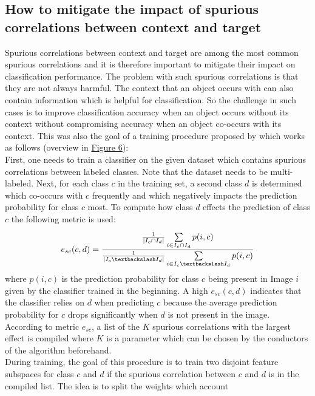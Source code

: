 \documentclass{article}
\begin{document}
\subsection{How to mitigate the impact of spurious correlations between context and target}
\label{sec:contextSuppr}
Spurious correlations between context and target are among the most common spurious correlations and it is
therefore important to mitigate their impact on classification performance. The problem with such spurious correlations
is that they are not always harmful. The context that an object occurs with can also contain information which is helpful
for classification. So the challenge in such cases is to improve classification accuracy when an object occurs without
its context without compromising accuracy when an object co-occurs with its context. This was also the goal of a 
training procedure proposed by \cite{Singh_2020_CVPR} which works as follows
(overview in \hyperref[fig:contextSupprImg]{Figure 6}): \\
First, one needs to train a classifier on the given dataset which contains spurious correlations between labeled classes.
Note that the dataset needs to be multi-labeled. Next, for each class $c$ in the training set, a second class $d$ is
determined which co-occurs with $c$ frequently and which negatively impacts the prediction probability for class $c$ most.
To compute how class $d$ effects the prediction of class $c$ the following metric is used:  
\begin{align*}
    e_{sc}(c,d) = \frac{\frac{1}{|I_c \cap I_d|} \sum\limits_{i \in I_c \cap I_d}^{} p(i,c)}
    {\frac{1}{|I_c \textbackslash I_d|} \sum\limits_{i \in I_c \textbackslash I_d} p(i,c)}
\end{align*}
where $p(i,c)$ is the prediction probability for class $c$ being present in Image $i$ given by the classifier
trained in the beginning. A high $e_{sc}(c,d)$ indicates that the classifier relies on $d$ when predicting $c$
because the average prediction probability for $c$ drops significantly when $d$ is not present in the image. \\
According to metric $e_{sc}$, a list of the $K$ spurious correlations with the largest effect is compiled where $K$
is a parameter which can be chosen by the conductors of the algorithm beforehand. \\
During training, the goal of this procedure is to train two disjoint feature subspaces for class $c$ and $d$
if the spurious correlation between $c$ and $d$ is in the compiled list. The idea is to split the weights which account
\end{document}
